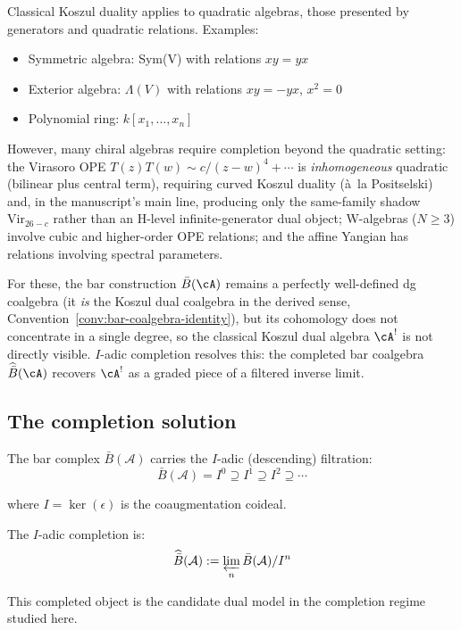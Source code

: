 \begin{observation}\label{obs:quadratic-limitation}
Classical Koszul duality applies to quadratic algebras, those presented by generators and quadratic relations. Examples:
\begin{itemize}
\item Symmetric algebra: Sym(V) with relations $xy = yx$
\item Exterior algebra: $\Lambda(V)$ with relations $xy = -yx$, $x^2 = 0$
\item Polynomial ring: $k[x_1, \ldots, x_n]$
\end{itemize}

However, many chiral algebras require completion beyond the quadratic
setting: the Virasoro OPE $T(z)T(w) \sim c/(z-w)^4 + \cdots$ is
\emph{inhomogeneous} quadratic (bilinear plus central term), requiring
curved Koszul duality (\`{a}~la Positselski) and, in the manuscript's
main line, producing only the same-family shadow
$\mathrm{Vir}_{26-c}$ rather than an H-level infinite-generator dual
object; W-algebras ($N \geq 3$) involve cubic and higher-order OPE
relations; and the affine Yangian has relations involving spectral
parameters.

For these, the bar construction $\bar{B}(\cA)$ remains a perfectly well-defined dg coalgebra (it \emph{is} the Koszul dual coalgebra in the derived sense, Convention~\ref{conv:bar-coalgebra-identity}), but its cohomology does not concentrate in a single degree, so the classical Koszul dual algebra $\cA^!$ is not directly visible.  $I$-adic completion resolves this: the completed bar coalgebra $\widehat{\bar{B}}(\cA)$ recovers $\cA^!$ as a graded piece of a filtered inverse limit.
\end{observation}

\subsection{The completion solution}

\begin{idea}\label{idea:I-adic}
The bar complex $\bar{B}(\mathcal{A})$ carries the $I$-adic (descending) filtration:
\[\bar{B}(\mathcal{A}) = I^0 \supseteq I^1 \supseteq I^2 \supseteq \cdots\]

where $I = \ker(\epsilon)$ is the coaugmentation coideal.

The $I$-adic completion is:
\[\widehat{\bar{B}}(\mathcal{A}) := \varprojlim_n \bar{B}(\mathcal{A})/I^n\]

This completed object is the candidate dual model in the completion
regime studied here.
\end{idea}


